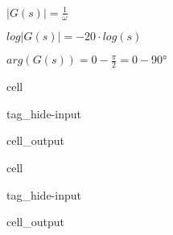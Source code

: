 \documentclass[letterpaper,10pt,english]{jupyterBook}
\begin{document}
\sphinxAtStartPar
\(|G(s)| = \frac{1}{\omega}\)

\sphinxAtStartPar
\(log|G(s)| = - 20\cdot log(s)\)

\begin{DUlineblock}{0em}
\item[] 
\end{DUlineblock}

\sphinxAtStartPar
\(arg(G(s)) = 0 - \frac{\pi}{2} = 0- 90°\)

\begin{sphinxuseclass}{cell}
\begin{sphinxuseclass}{tag_hide-input}\begin{sphinxVerbatimOutput}

\begin{sphinxuseclass}{cell_output}
\begin{sphinxVerbatim}[commandchars=\\\{\}]
\PYGZsq{}\PYGZsq{}
\end{sphinxVerbatim}

\noindent{}

\end{sphinxuseclass}\end{sphinxVerbatimOutput}

\end{sphinxuseclass}
\end{sphinxuseclass}
\begin{DUlineblock}{0em}
\item[] 
\end{DUlineblock}

\begin{sphinxuseclass}{cell}
\begin{sphinxuseclass}{tag_hide-input}\begin{sphinxVerbatimOutput}

\begin{sphinxuseclass}{cell_output}
\noindent{}

\end{sphinxuseclass}\end{sphinxVerbatimOutput}

\end{sphinxuseclass}
\end{sphinxuseclass}
\begin{DUlineblock}{0em}
\item[] 
\end{DUlineblock}
\end{document}
